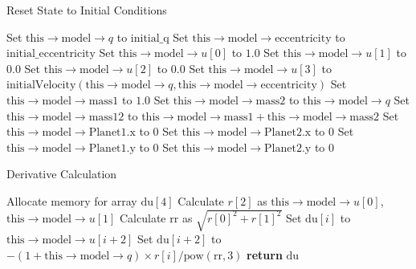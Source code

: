 \documentclass{article}
\begin{document}
\begin{algorithm}
\caption{Reset State to Initial Conditions}
\begin{algorithmic}[1]
    \State Set $\text{this} \rightarrow \text{model} \rightarrow q$ to $\text{initial\_q}$
    \State Set $\text{this} \rightarrow \text{model} \rightarrow \text{eccentricity}$ to $\text{initial\_eccentricity}$
    \State Set $\text{this} \rightarrow \text{model} \rightarrow u[0]$ to $1.0$
    \State Set $\text{this} \rightarrow \text{model} \rightarrow u[1]$ to $0.0$
    \State Set $\text{this} \rightarrow \text{model} \rightarrow u[2]$ to $0.0$
    \State Set $\text{this} \rightarrow \text{model} \rightarrow u[3]$ to $\text{initialVelocity}(\text{this} \rightarrow \text{model} \rightarrow q, \text{this} \rightarrow \text{model} \rightarrow \text{eccentricity})$
    \State Set $\text{this} \rightarrow \text{model} \rightarrow \text{mass1}$ to $1.0$
    \State Set $\text{this} \rightarrow \text{model} \rightarrow \text{mass2}$ to $\text{this} \rightarrow \text{model} \rightarrow q$
    \State Set $\text{this} \rightarrow \text{model} \rightarrow \text{mass12}$ to $\text{this} \rightarrow \text{model} \rightarrow \text{mass1} + \text{this} \rightarrow \text{model} \rightarrow \text{mass2}$
    \State Set $\text{this} \rightarrow \text{model} \rightarrow \text{Planet1.x}$ to $0$
    \State Set $\text{this} \rightarrow \text{model} \rightarrow \text{Planet2.x}$ to $0$
    \State Set $\text{this} \rightarrow \text{model} \rightarrow \text{Planet1.y}$ to $0$
    \State Set $\text{this} \rightarrow \text{model} \rightarrow \text{Planet2.y}$ to $0$
\EndFunction
\end{algorithmic}
\end{algorithm}

\begin{algorithm}
\caption{Derivative Calculation}
\begin{algorithmic}[1]
    \State Allocate memory for array $\text{du}[4]$
    \State Calculate $r[2]$ as $\text{this} \rightarrow \text{model} \rightarrow u[0]$, $\text{this} \rightarrow \text{model} \rightarrow u[1]$
    \State Calculate $\text{rr}$ as $\sqrt{r[0]^2 + r[1]^2}$
        \State Set $\text{du}[i]$ to $\text{this} \rightarrow \text{model} \rightarrow u[i + 2]$
        \State Set $\text{du}[i + 2]$ to $-(1 + \text{this} \rightarrow \text{model} \rightarrow q) \times r[i] / \text{pow}(\text{rr}, 3)$
    \EndFor
    \State \textbf{return} $\text{du}$
\EndFunction
\end{algorithmic}
\end{algorithm}
\end{document}
